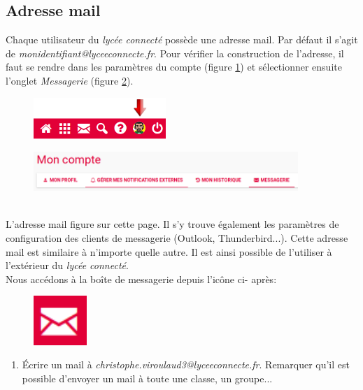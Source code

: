 \documentclass[a4paper,11pt]{article}
\begin{document}
\begin{Form}
\subsection{Adresse mail}
Chaque utilisateur du \emph{lycée connecté} possède une adresse mail. Par défaut il s'agit de \emph{monidentifiant@lyceeconnecte.fr}. Pour vérifier la construction de l'adresse, il faut se rendre dans les paramètres du compte (figure \ref{compte}) et sélectionner ensuite l'onglet \emph{Messagerie} (figure \ref{comptemail}).
\begin{figure}[!h]
\centering
\includegraphics[width=5cm]{ressources/bandeaucompte.png}
\label{compte}
\end{figure}
\begin{figure}[!h]
\centering
\includegraphics[width=10cm]{ressources/moncompte.png}
\label{comptemail}
\end{figure}
\\L'adresse mail figure sur cette page. Il s'y trouve également les paramètres de configuration des clients de messagerie (Outlook, Thunderbird...). Cette adresse mail est similaire à n'importe quelle autre. Il est ainsi possible de l'utiliser à l'extérieur du \emph{lycée connecté}.\\
Nous accédons à la boîte de messagerie depuis l'icône ci- après:
\begin{figure}[!h]
\centering
\includegraphics[width=2cm]{ressources/mail.png}
\label{mail}
\end{figure}
\begin{activite}
\begin{enumerate}
\item Écrire un mail à \emph{christophe.viroulaud3@lyceeconnecte.fr}. Remarquer qu'il est possible d'envoyer un mail à toute une classe, un groupe...

\end{enumerate}
\end{activite}
\end{Form}
\end{document}
